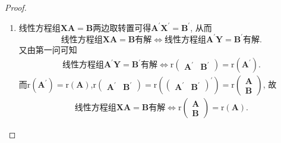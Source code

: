 \documentclass[../../main.tex]{subfiles}%
\begin{document}
\begin{proof}
\begin{enumerate}
\item 线性方程组\(\boldsymbol{XA}=\boldsymbol{B}\)两边取转置可得\(\boldsymbol{A}^{\prime}\boldsymbol{X}^{\prime}=\boldsymbol{B}^{\prime}\), 从而
\[
\text{线性方程组}\boldsymbol{XA}=\boldsymbol{B}\text{有解}\Leftrightarrow\text{线性方程组}\boldsymbol{A}^{\prime}\boldsymbol{Y}=\boldsymbol{B}^{\prime}\text{有解}.
\]
又由第一问可知
\begin{align*}
\text{线性方程组}\boldsymbol{A}^{\prime}\boldsymbol{Y}=\boldsymbol{B}^{\prime}\text{有解}\Leftrightarrow \mathrm{r}\begin{pmatrix}\boldsymbol{A}^{\prime}&\boldsymbol{B}^{\prime}\end{pmatrix}=\mathrm{r}(\boldsymbol{A}^{\prime}).
\end{align*}
而\(\mathrm{r}(\boldsymbol{A}^{\prime})=\mathrm{r}(\boldsymbol{A})\),\(\mathrm{r}\begin{pmatrix}\boldsymbol{A}^{\prime}&\boldsymbol{B}^{\prime}\end{pmatrix}=\mathrm{r}\left(\begin{pmatrix}\boldsymbol{A}^{\prime}&\boldsymbol{B}^{\prime}\end{pmatrix}^{\prime}\right)=\mathrm{r}\begin{pmatrix}\boldsymbol{A}\\\boldsymbol{B}\end{pmatrix}\), 故
\begin{align*}
\text{线性方程组}\boldsymbol{XA}=\boldsymbol{B}\text{有解}\Leftrightarrow \mathrm{r}\begin{pmatrix}\boldsymbol{A}\\\boldsymbol{B}\end{pmatrix}=\mathrm{r}(\boldsymbol{A}).
\end{align*} 
\end{enumerate}
\end{proof}
\end{document}
